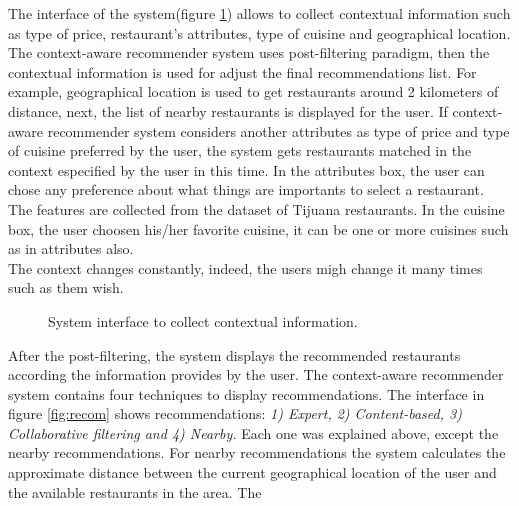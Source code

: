 The interface of the system(figure \ref{fig:context}) allows to
collect contextual information such as type of price, restaurant's
attributes, type of cuisine and geographical location. The context-aware recommender system uses post-filtering paradigm, then the
contextual information is used for adjust the final recommendations
list. For example, geographical location is used to get restaurants
around 2 kilometers of distance, next, the list of nearby restaurants
is displayed for the user. If context-aware recommender system
considers another attributes as type of price and type of cuisine
preferred by the user, the system gets restaurants matched in the
context especified by the user in this time. In the attributes box,
the user can chose any preference about what things are importants to
select a restaurant. The features are collected from the dataset of
Tijuana restaurants. In the cuisine box, the user choosen his/her
favorite cuisine, it can be one or more cuisines such as in attributes 
also.\\  
The context changes constantly, indeed, the users migh change 
it many times such as them wish.
\begin{figure}
\captionsetup{justification=centering,margin=2cm,font=footnotesize}
\centering
{}
\caption{System interface to collect contextual information.}
\label{fig:context}   
\end{figure}
After the post-filtering, the system displays the  recommended
restaurants according the information provides by the user. The
context-aware recommender system contains four techniques to display
recommendations. The interface in figure \ref{fig:recom} shows
recommendations: \textit{1) Expert, 2) Content-based, 3) Collaborative
filtering and 4) Nearby.} Each one was explained above, except the
nearby recommendations. For nearby recommendations the system
calculates the approximate distance between the current geographical
location of the user and the available restaurants in the area.  The
